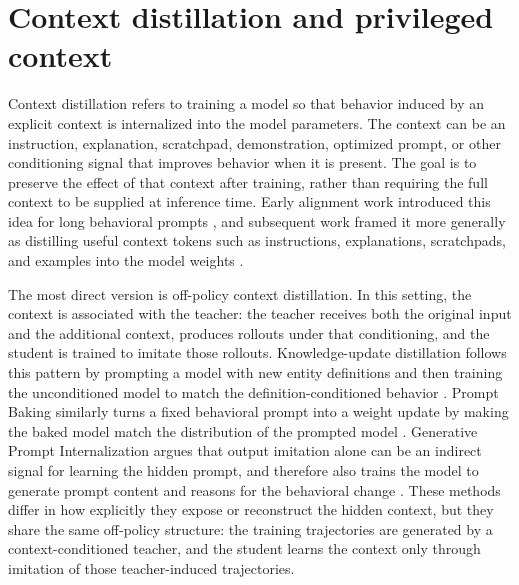 \section{Context distillation and privileged context}

Context distillation refers to training a model so that behavior induced by an explicit context is internalized into the model parameters. The context can be an instruction, explanation, scratchpad, demonstration, optimized prompt, or other conditioning signal that improves behavior when it is present. The goal is to preserve the effect of that context after training, rather than requiring the full context to be supplied at inference time. Early alignment work introduced this idea for long behavioral prompts \cite{askell2021GeneralLanguageAssistant}, and subsequent work framed it more generally as distilling useful context tokens such as instructions, explanations, scratchpads, and examples into the model weights \cite{snell2022LearningDistillingContext}.

The most direct version is off-policy context distillation. In this setting, the context is associated with the teacher: the teacher receives both the original input and the additional context, produces rollouts under that conditioning, and the student is trained to imitate those rollouts. Knowledge-update distillation follows this pattern by prompting a model with new entity definitions and then training the unconditioned model to match the definition-conditioned behavior \cite{padmanabhan2023PropagatingKnowledgeUpdates}. Prompt Baking similarly turns a fixed behavioral prompt into a weight update by making the baked model match the distribution of the prompted model \cite{bhargava2024PromptBaking}. Generative Prompt Internalization argues that output imitation alone can be an indirect signal for learning the hidden prompt, and therefore also trains the model to generate prompt content and reasons for the behavioral change \cite{shin2025GenerativePromptInternalization}. These methods differ in how explicitly they expose or reconstruct the hidden context, but they share the same off-policy structure: the training trajectories are generated by a context-conditioned teacher, and the student learns the context only through imitation of those teacher-induced trajectories.

